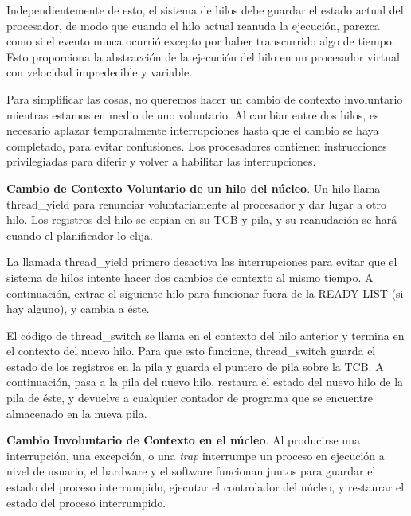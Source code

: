 \documentclass[10pt]{book}
\begin{document}
Independientemente de esto, el sistema de hilos debe guardar el estado actual del procesador, de modo que cuando el hilo actual reanuda la ejecución, parezca como si el evento nunca ocurrió excepto por haber transcurrido algo de tiempo. Esto proporciona la abstracción de la ejecución del hilo en un procesador virtual con velocidad impredecible y variable.

Para simplificar las cosas, no queremos hacer un cambio de contexto involuntario mientras estamos en medio de uno voluntario. Al cambiar entre dos hilos, es necesario aplazar temporalmente interrupciones hasta que el cambio se haya completado, para evitar confusiones. Los procesadores contienen instrucciones privilegiadas para diferir y volver a habilitar las interrupciones.

\textbf{Cambio de Contexto Voluntario de un hilo del núcleo}. Un hilo llama {\mf thread\_yield} para renunciar voluntariamente al procesador y dar lugar a otro hilo. Los registros del hilo se copian en su TCB y pila, y su reanudación se hará cuando el planificador lo elija.

La llamada {\mf thread\_yield} primero desactiva las interrupciones para evitar que el sistema de hilos intente hacer dos cambios de contexto al mismo tiempo. A continuación, extrae el siguiente hilo para funcionar fuera de la READY LIST (si hay alguno), y cambia a éste.

El código de {\mf thread\_switch} se llama en el contexto del hilo anterior y termina en el contexto del nuevo hilo. Para que esto funcione, {\mf thread\_switch} guarda el estado de los registros en la pila y guarda el puntero de pila sobre la TCB. A continuación, pasa a la pila del nuevo hilo, restaura el estado del nuevo hilo de la pila de éste, y devuelve a cualquier contador de programa que se encuentre almacenado en la nueva pila.

\textbf{Cambio Involuntario de Contexto en el núcleo}. Al producirse una interrupción, una excepción, o una \textit{trap} interrumpe un proceso en ejecución a nivel de usuario, el hardware y el software funcionan juntos para guardar el estado del proceso interrumpido, ejecutar el controlador del núcleo, y restaurar el estado del proceso interrumpido.
\end{document}

